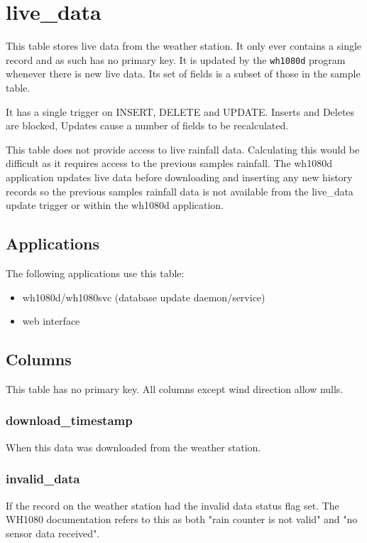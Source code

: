\documentclass[a4paper,10pt]{book}
\begin{document}
\section{live\_data}
This table stores live data from the weather station. It only ever contains a single record and as such has no primary key. It is updated by the \verb|wh1080d| program whenever there is new live data. Its set of fields is a subset of those in the sample table.

It has a single trigger on INSERT, DELETE and UPDATE. Inserts and Deletes are blocked, Updates cause a number of fields to be recalculated.

This table does not provide access to live rainfall data. Calculating this would be difficult as it requires access to the previous samples rainfall. The wh1080d application updates live data before downloading and inserting any new history records so the previous samples rainfall data is not available from the live\_data update trigger or within the wh1080d application.

\subsection{Applications}
The following applications use this table:
\begin{itemize}
\item wh1080d/wh1080svc (database update daemon/service)
\item web interface
\end{itemize}

\subsection{Columns}
This table has no primary key. All columns except wind direction allow nulls.

\subsubsection{download\_timestamp}
When this data was downloaded from the weather station.

\subsubsection{invalid\_data}
If the record on the weather station had the invalid data status flag set. The WH1080 documentation refers to this as both "rain counter is not valid" and "no sensor data received".
\end{document}
